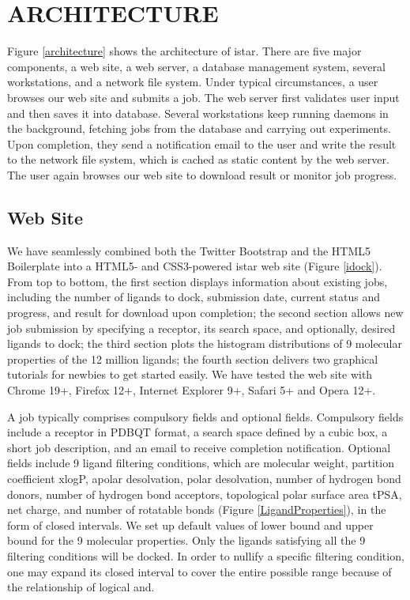 \documentclass[12pt]{article}
\begin{document}
\section*{\sffamily \Large ARCHITECTURE}

Figure \ref{architecture} shows the architecture of istar. There are five major components, a web site, a web server, a database management system, several workstations, and a network file system. Under typical circumstances, a user browses our web site and submits a job. The web server first validates user input and then saves it into database. Several workstations keep running daemons in the background, fetching jobs from the database and carrying out experiments. Upon completion, they send a notification email to the user and write the result to the network file system, which is cached as static content by the web server. The user again browses our web site to download result or monitor job progress.

\subsection*{\sffamily \large Web Site}

We have seamlessly combined both the Twitter Bootstrap and the HTML5 Boilerplate into a HTML5- and CSS3-powered istar web site (Figure \ref{idock}). From top to bottom, the first section displays information about existing jobs, including the number of ligands to dock, submission date, current status and progress, and result for download upon completion; the second section allows new job submission by specifying a receptor, its search space, and optionally, desired ligands to dock; the third section plots the histogram distributions of 9 molecular properties of the 12 million ligands; the fourth section delivers two graphical tutorials for newbies to get started easily. We have tested the web site with Chrome 19+, Firefox 12+, Internet Explorer 9+, Safari 5+ and Opera 12+.

A job typically comprises compulsory fields and optional fields. Compulsory fields include a receptor in PDBQT format, a search space defined by a cubic box, a short job description, and an email to receive completion notification. Optional fields include 9 ligand filtering conditions, which are molecular weight, partition coefficient xlogP, apolar desolvation, polar desolvation, number of hydrogen bond donors, number of hydrogen bond acceptors, topological polar surface area tPSA, net charge, and number of rotatable bonds (Figure \ref{LigandProperties}), in the form of closed intervals. We set up default values of lower bound and upper bound for the 9 molecular properties. Only the ligands satisfying all the 9 filtering conditions will be docked. In order to nullify a specific filtering condition, one may expand its closed interval to cover the entire possible range because of the relationship of logical and.
\end{document}
